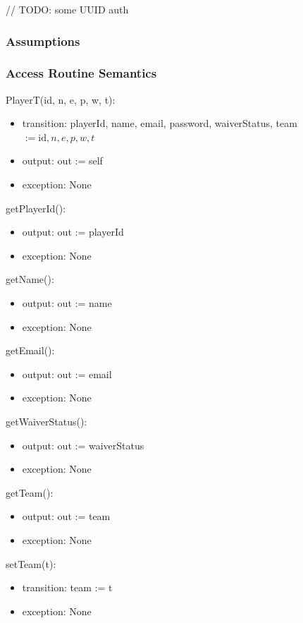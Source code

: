 \documentclass[12pt, titlepage]{article}
\begin{document}
// TODO: some UUID auth

\subsubsection{Assumptions}

\subsubsection{Access Routine Semantics}

\noindent PlayerT(id, n, e, p, w, t):
\begin{itemize}
  \item transition: playerId, name, email, password, waiverStatus, team $:= \text{id}, n, e, p, w, t$
  \item output: out := self
  \item exception: None
\end{itemize}

\noindent getPlayerId():
\begin{itemize}
  \item output: out := playerId
  \item exception: None
\end{itemize}

\noindent getName():
\begin{itemize}
  \item output: out := name
  \item exception: None
\end{itemize}

\noindent getEmail():
\begin{itemize}
  \item output: out := email
  \item exception: None
\end{itemize}

\noindent getWaiverStatus():
\begin{itemize}
  \item output: out := waiverStatus
  \item exception: None
\end{itemize}

\noindent getTeam():
\begin{itemize}
  \item output: out := team
  \item exception: None
\end{itemize}

\noindent setTeam(t):
\begin{itemize}
  \item transition: team := t
  \item exception: None
\end{itemize}
\end{document}
